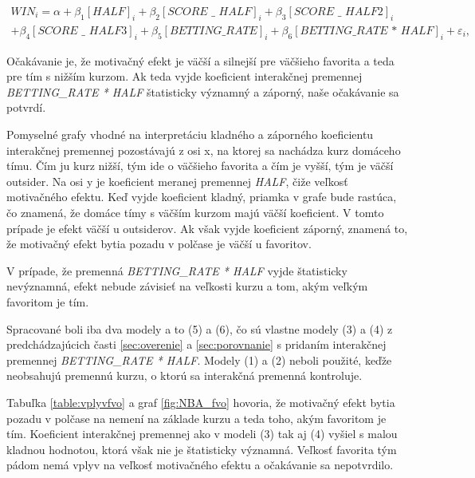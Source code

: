 \documentclass[
  digital, %
  oneside, %
  notable,   %
  lof,     %
  lot,     %
]{fithesis3}
\begin{document}
	\begin{multline}
	WIN_{i} = \alpha + \beta _{1} [\textit{HALF}]_{i} + \beta _{2} [\textit{SCORE~\_~HALF}]_{i} + \beta _{3} [\textit{SCORE~\_~HALF2}]_{i} \\
	+ \beta _{4} [\textit{SCORE~\_~HALF3}]_{i} + \beta _{5} [\textit{BETTING\_RATE}]_{i} + \beta _{6} [\textit{BETTING\_RATE * HALF}]_{i} + \varepsilon_{i},
	\end{multline}
	
	Očakávanie je, že motivačný efekt je väčší a silnejší pre väčšieho favorita a teda pre tím s nižším kurzom. Ak teda vyjde koeficient interakčnej premennej \textit{BETTING\_RATE * HALF} štatisticky významný  a záporný, naše očakávanie sa potvrdí. 
	
	Pomyselné grafy vhodné na interpretáciu kladného a záporného koeficientu interakčnej premennej pozostávajú z osi x, na ktorej sa nachádza kurz domáceho tímu. Čím ju kurz nižší, tým ide o väčšieho favorita a čím je vyšší, tým je väčší outsider. Na osi y je koeficient meranej premennej \textit{HALF}, čiže veľkosť motivačného efektu. Keď vyjde koeficient kladný, priamka v grafe bude rastúca, čo znamená, že domáce tímy s väčším kurzom majú väčší koeficient. V tomto prípade je efekt väčší u outsiderov. Ak však vyjde koeficient záporný, znamená to, že motivačný efekt bytia pozadu v polčase je väčší u favoritov.
	
	V prípade, že premenná \textit{BETTING\_RATE * HALF} vyjde štatisticky nevýznamná, efekt nebude závisieť na veľkosti kurzu a tom, akým veľkým favoritom je tím.
	
	Spracované boli iba dva modely a to (5) a (6), čo sú vlastne modely (3) a (4) z predchádzajúcich časti \ref{sec:overenie} a \ref{sec:porovnanie} s pridaním interakčnej premennej \textit{BETTING\_RATE * HALF}.  Modely (1) a (2) neboli použité, keďže neobsahujú premennú kurzu, o ktorú sa interakčná premenná kontroluje.
	
	Tabuľka \ref{table:vplyvfvo} a graf \ref{fig:NBA_fvo} hovoria, že motivačný efekt bytia pozadu v polčase na nemení na základe kurzu a teda toho, akým favoritom je tím. Koeficient interakčnej premennej ako v modeli (3) tak aj (4) vyšiel s malou kladnou hodnotou, ktorá však nie je štatisticky významná. Veľkosť favorita tým pádom nemá vplyv na veľkosť motivačného efektu a očakávanie sa nepotvrdilo.
	
\end{document}
